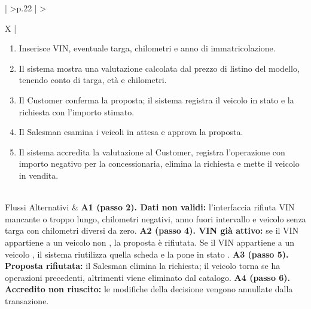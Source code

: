 \begin{xltabular}{\textwidth}{| >{\bfseries}p{.22\textwidth} | >{\raggedright\arraybackslash}X |}
\begin{enumerate}[label=\arabic*.,start=1,leftmargin=*,nosep]
  \item Inserisce VIN, eventuale targa, chilometri e anno di immatricolazione.
  \item Il sistema mostra una valutazione calcolata dal prezzo di listino del modello, tenendo conto di targa, età e chilometri.
  \item Il Customer conferma la proposta; il sistema registra il veicolo in stato  e la richiesta con l'importo stimato.
  \item Il Salesman esamina i veicoli in attesa e approva la proposta.
  \item Il sistema accredita la valutazione al Customer, registra l'operazione con importo negativo per la concessionaria, elimina la richiesta e mette il veicolo in vendita.
\end{enumerate}\\\hline
Flussi Alternativi &
\textbf{A1 (passo 2). Dati non validi:} l'interfaccia rifiuta VIN mancante o troppo lungo, chilometri negativi, anno fuori intervallo e veicolo senza targa con chilometri diversi da zero.\newline\newline
\textbf{A2 (passo 4). VIN già attivo:} se il VIN appartiene a un veicolo non , la proposta è rifiutata. Se il VIN appartiene a un veicolo , il sistema riutilizza quella scheda e la pone in stato .\newline\newline
\textbf{A3 (passo 5). Proposta rifiutata:} il Salesman elimina la richiesta; il veicolo torna  se ha operazioni precedenti, altrimenti viene eliminato dal catalogo.\newline\newline
\textbf{A4 (passo 6). Accredito non riuscito:} le modifiche della decisione vengono annullate dalla transazione.\\\hline
\end{xltabular}
